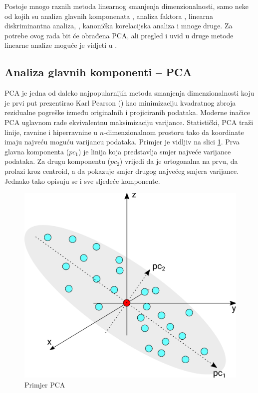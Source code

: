 \documentclass[times, utf8, diplomski]{fer}
\begin{document}
Postoje mnogo raznih metoda linearnog smanjenja dimenzionalnosti, samo neke od kojih su analiza glavnih komponenata , analiza faktora , linearna diskriminantna analiza, , kanonička korelacijska analiza  i mnoge druge. Za potrebe ovog rada bit će obrađena PCA, ali pregled i uvid u druge metode linearne analize moguće je vidjeti u \cite{cunningham2015linear}.

\subsection{Analiza glavnih komponenti -- PCA}

PCA je jedna od daleko najpopularnijih metoda smanjenja dimenzionalnosti koju je prvi put prezentirao Karl Pearson (\citeyear{pearson1901liii}) kao minimizaciju kvadratnog zbroja rezidualne pogreške između originalnih i projiciranih podataka. Moderne inačice PCA uglavnom rade ekvivalentnu maksimizaciju varijance. Statistički, PCA traži linije, ravnine i hiperravnine u $n$-dimenzionalnom prostoru tako da koordinate imaju najveću moguću varijancu podataka. Primjer je vidljiv na slici \ref{fig:pca}. Prva glavna komponenta ($pc_1$) je linija koja predstavlja smjer najveće varijance podataka. Za drugu komponentu ($pc_2$) vrijedi da je ortogonalna na prvu, da prolazi kroz centroid, a da pokazuje smjer drugog najvećeg smjera varijance. Jednako tako opisuju se i sve sljedeće komponente.
\begin{figure}[htb]
    \centering
    \includegraphics{resources/images/reduction/pca.png}
    \caption{Primjer PCA}
    \label{fig:pca}
\end{figure}
\end{document}
